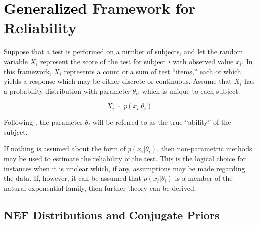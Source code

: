 \documentclass[12pt,epsfig]{article}
\newcommand{\change}[1]{\textcolor{black}{#1}}
\begin{document}
\section{\change{Generalized} Framework for Reliability}
\label{Sec:Theory}

Suppose that a test is performed on a number of subjects, and let the random variable $X_i$ represent the score of the test for subject $i$ with observed value $x_i$. In this framework, $X_i$ represents a count or a sum of test ``items,'' each of which yields a response which may be either discrete or continuous.  Assume that $X_i$ has a probability distribution with parameter $\theta_i$, which is unique to each subject. 

\begin{equation*}
X_i \sim p(x_i | \theta_i)
\end{equation*}


\noindent  Following \cite{Lord1968}, the parameter $\theta_i$ will be referred to as the true ``ability''  of the subject. %

If nothing is assumed about the form of $p(x_i | \theta_i)$, then non-parametric methods may be used to estimate the reliability of the test. This is the logical choice for instances when it is unclear which, if any, assumptions may be made regarding the data. If, however, it can be assumed that $p(x_i | \theta_i)$ is a member of the natural exponential family, then further theory can be derived.



\subsection{NEF Distributions and Conjugate Priors}
\label{Subsec:NEFQVF}
\end{document}
